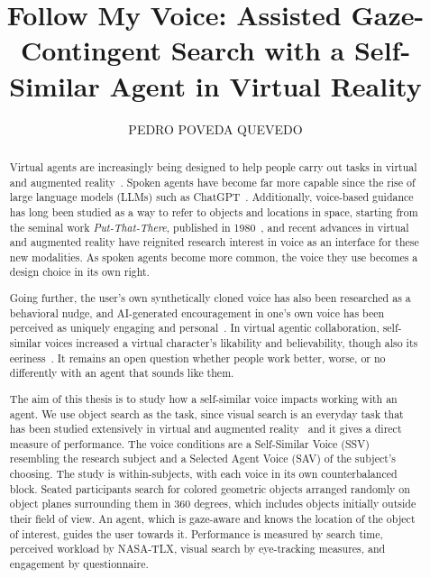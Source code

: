 \documentclass{UCF_ETD}
\title{Follow My Voice: Assisted Gaze-Contingent Search with a Self-Similar Agent in Virtual Reality}
\author{PEDRO POVEDA QUEVEDO}
\begin{document}
\frontmatter
\maketitle
{}

\begin{abstract}
Virtual agents are increasingly being designed to help people carry out tasks in virtual and augmented reality~\cite{bovo2025embardiment,madritsch2026assistance,venkatakrishnan2026clarifying}. Spoken agents have become far more capable since the rise of large language models (LLMs) such as ChatGPT~\cite{bovo2025embardiment}. Additionally, voice-based guidance has long been studied as a way to refer to objects and locations in space, starting from the seminal work \emph{Put-That-There}, published in 1980~\cite{bolt1980putthatthere}, and recent advances in virtual and augmented reality have reignited research interest in voice as an interface for these new modalities. As spoken agents become more common, the voice they use becomes a design choice in its own right.

Going further, the user's own synthetically cloned voice has also been researched as a behavioral nudge, and AI-generated encouragement in one's own voice has been perceived as uniquely engaging and personal~\cite{fang2025emotional}. In virtual agentic collaboration, self-similar voices increased a virtual character's likability and believability, though also its eeriness~\cite{guo2024doppelganger}. It remains an open question whether people work better, worse, or no differently with an agent that sounds like them.

The aim of this thesis is to study how a self-similar voice impacts working with an agent. We use object search as the task, since visual search is an everyday task that has been studied extensively in virtual and augmented reality~\cite{trepkowski2019fov,chiossi2024searching,kelley2025cueing} and it gives a direct measure of performance. The voice conditions are a Self-Similar Voice (SSV) resembling the research subject and a Selected Agent Voice (SAV) of the subject's choosing. The study is within-subjects, with each voice in its own counterbalanced block. Seated participants search for colored geometric objects arranged randomly on object planes surrounding them in 360 degrees, which includes objects initially outside their field of view. An agent, which is gaze-aware and knows the location of the object of interest, guides the user towards it. Performance is measured by search time, perceived workload by NASA-TLX, visual search by eye-tracking measures, and engagement by questionnaire.


\end{abstract}
\end{document}
